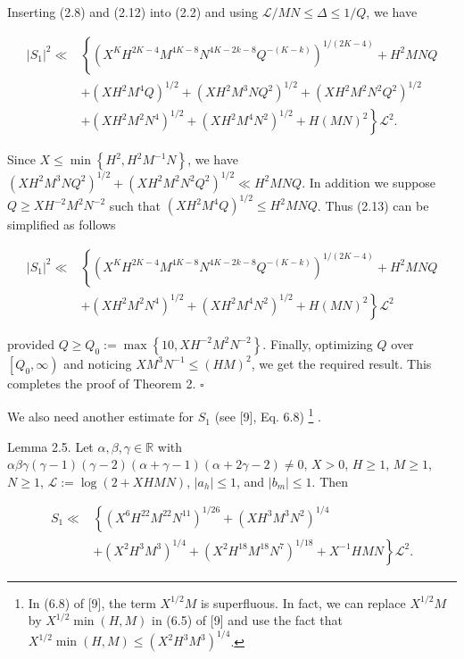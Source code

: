 \documentclass[10pt]{article}
\newcommand{\starfootnote}[1]{%
  \begingroup
  \renewcommand{\thefootnote}{\fnsymbol{footnote}}%
  \footnote[1]{#1}%
  \endgroup
}
\begin{document}
Inserting (2.8) and (2.12) into (2.2) and using $\mathscr{L} / M N \leqslant \Delta \leqslant 1 / Q$, we have


\begin{align*}
|S_{1}|^{2} \ll & \left\{\left(X^{K} H^{2 K-4} M^{4 K-8} N^{4 K-2 k-8} Q^{-(K-k)}\right)^{1 /(2 K-4)}+H^{2} M N Q\right. \\
& +\left(X H^{2} M^{4} Q\right)^{1 / 2}+\left(X H^{2} M^{3} N Q^{2}\right)^{1 / 2}+\left(X H^{2} M^{2} N^{2} Q^{2}\right)^{1 / 2} \\
& \left.+\left(X H^{2} M^{2} N^{4}\right)^{1 / 2}+\left(X H^{2} M^{4} N^{2}\right)^{1 / 2}+H(M N)^{2}\right\} \mathscr{L}^{2} . \tag{2.13}
\end{align*}


Since $X \leqslant \min \left\{H^{2}, H^{2} M^{-1} N\right\}$, we have $\left(X H^{2} M^{3} N Q^{2}\right)^{1 / 2}+\left(X H^{2} M^{2} N^{2} Q^{2}\right)^{1 / 2} \ll H^{2} M N Q$. In addition we suppose $Q \geqslant X H^{-2} M^{2} N^{-2}$ such that $\left(X H^{2} M^{4} Q\right)^{1 / 2} \leqslant H^{2} M N Q$. Thus (2.13) can be simplified as follows

$$
\begin{aligned}
|S_{1}|^{2} \ll & \left\{\left(X^{K} H^{2 K-4} M^{4 K-8} N^{4 K-2 k-8} Q^{-(K-k)}\right)^{1 /(2 K-4)}+H^{2} M N Q\right. \\
& \left.+\left(X H^{2} M^{2} N^{4}\right)^{1 / 2}+\left(X H^{2} M^{4} N^{2}\right)^{1 / 2}+H(M N)^{2}\right\} \mathscr{L}^{2}
\end{aligned}
$$

provided $Q \geqslant Q_{0}:=\max \left\{10, X H^{-2} M^{2} N^{-2}\right\}$. Finally, optimizing $Q$ over $\left[Q_{0}, \infty\right)$ and noticing $X M^{3} N^{-1} \leqslant(H M)^{2}$, we get the required result. This completes the proof of Theorem 2. \(\square\)

We also need another estimate for $S_{1}$ (see [9], Eq. 6.8)\starfootnote{In (6.8) of [9], the term $X^{1/2}M$ is superfluous. In fact, we can replace $X^{1/2}M$ by $X^{1/2}\min(H,M)$ in (6.5) of [9] and use the fact that $X^{1/2}\min(H,M)\leqslant(X^{2}H^{3}M^{3})^{1/4}$.}.

Lemma 2.5. Let $\alpha,\beta,\gamma\in\mathbb R$ with
$\alpha\beta\gamma(\gamma-1)(\gamma-2)(\alpha+\gamma-1)(\alpha+2\gamma-2)\neq0$,
$X>0$, $H\geqslant1$, $M\geqslant1$, $N\geqslant1$,
$\mathscr L:=\log(2+XHMN)$, $|a_h|\leqslant1$, and $|b_m|\leqslant1$. Then

$$
\begin{aligned}
S_{1} \ll & \left\{\left(X^{6} H^{22} M^{22} N^{11}\right)^{1 / 26}+\left(X H^{3} M^{3} N^{2}\right)^{1 / 4}\right. \\
& \left.+\left(X^{2} H^{3} M^{3}\right)^{1 / 4}+\left(X^{2} H^{18} M^{18} N^{7}\right)^{1 / 18}+X^{-1} H M N\right\} \mathscr{L}^{2} .
\end{aligned}
$$
\end{document}
